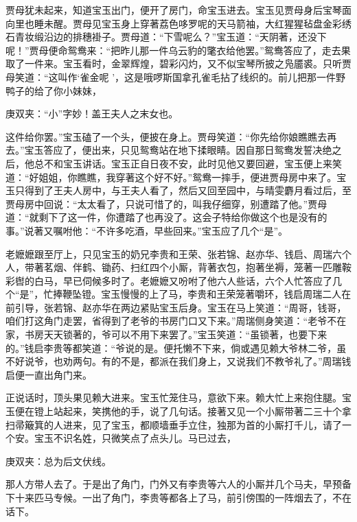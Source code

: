 \begin{parag}
    贾母犹未起来，知道宝玉出门，便开了房门，命宝玉进去。宝玉见贾母身后宝琴面向里也睡未醒。贾母见宝玉身上穿著荔色哆罗呢的天马箭袖，大红猩猩毡盘金彩绣石青妆缎沿边的排穗褂子。贾母道：“下雪呢么？”宝玉道：“天阴著，还没下呢！”贾母便命鸳鸯来：“把昨儿那一件乌云豹的氅衣给他罢。”鸳鸯答应了，走去果取了一件来。宝玉看时，金翠辉煌，碧彩闪灼，又不似宝琴所披之凫靥裘。只听贾母笑道：“这叫作‘雀金呢 ’，这是哦啰斯国拿孔雀毛拈了线织的。前儿把那一件野鸭子的给了你小妹妹，\begin{note}庚双夹：“小”字妙！盖王夫人之末女也。\end{note}这件给你罢。”宝玉磕了一个头，便披在身上。贾母笑道：“你先给你娘瞧瞧去再去。”宝玉答应了，便出来，只见鸳鸯站在地下揉眼睛。因自那日鸳鸯发誓决绝之后，他总不和宝玉讲话。宝玉正自日夜不安，此时见他又要回避，宝玉便上来笑道：“好姐姐，你瞧瞧，我穿著这个好不好。”鸳鸯一摔手，便进贾母房中来了。宝玉只得到了王夫人房中，与王夫人看了，然后又回至园中，与晴雯麝月看过后，至贾母房中回说：“太太看了，只说可惜了的，叫我仔细穿，别遭踏了他。”贾母道：“就剩下了这一件，你遭踏了也再没了。这会子特给你做这个也是没有的事。”说著又嘱咐他：“不许多吃酒，早些回来。”宝玉应了几个“是”。
\end{parag}


\begin{parag}
    老嬷嬷跟至厅上，只见宝玉的奶兄李贵和王荣、张若锦、赵亦华、钱启、周瑞六个人，带著茗烟、伴鹤、锄药、扫红四个小厮，背著衣包，抱著坐褥，笼著一匹雕鞍彩辔的白马，早已伺候多时了。老嬷嬷又吩咐了他六人些话，六个人忙答应了几个“是”，忙捧鞭坠镫。宝玉慢慢的上了马，李贵和王荣笼著嚼环，钱启周瑞二人在前引导，张若锦、赵亦华在两边紧贴宝玉后身。宝玉在马上笑道：“周哥，钱哥，咱们打这角门走罢，省得到了老爷的书房门口又下来。”周瑞侧身笑道：“老爷不在家，书房天天锁著的，爷可以不用下来罢了。”宝玉笑道：“虽锁著，也要下来的。”钱启李贵等都笑道：“爷说的是。便托懒不下来，倘或遇见赖大爷林二爷，虽不好说爷，也劝两句。有的不是，都派在我们身上，又说我们不教爷礼了。”周瑞钱启便一直出角门来。
\end{parag}


\begin{parag}
    正说话时，顶头果见赖大进来。宝玉忙笼住马，意欲下来。赖大忙上来抱住腿。宝玉便在镫上站起来，笑携他的手，说了几句话。接著又见一个小厮带著二三十个拿扫帚簸箕的人进来，见了宝玉，都顺墙垂手立住，独那为首的小厮打千儿，请了一个安。宝玉不识名姓，只微笑点了点头儿。马已过去，\begin{note}庚双夹：总为后文伏线。\end{note}那人方带人去了。于是出了角门，门外又有李贵等六人的小厮并几个马夫，早预备下十来匹马专候。一出了角门，李贵等都各上了马，前引傍围的一阵烟去了，不在话下。
\end{parag}


